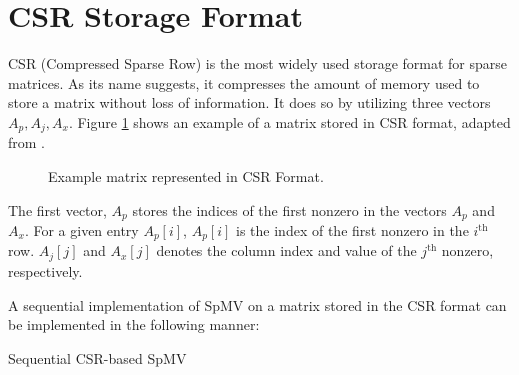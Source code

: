 

\section{CSR Storage Format}
CSR (Compressed Sparse Row) is the most widely used storage format for sparse matrices. As its name suggests, it compresses the amount of memory used to store a matrix without loss of information. It does so by utilizing three vectors \(A_{p}, A_{j}, A_{x}\). Figure \ref{fig:csrformat} shows an example of a matrix stored in CSR format, adapted from \cite{gupta2024gamgi}.



\begin{figure}[ht]
    \centering
    \caption{Example matrix represented in CSR Format.}
    \label{fig:csrformat}
\end{figure}


The first vector, \(A_{p}\) stores the indices of the first nonzero in the vectors \(A_{p}\) and \(A_{x}\). For a given entry \(A_{p}[i]\), \(A_{p}[i]\) is the index of the first nonzero in the \(i^{\text{th}}\) row. \(A_{j}[j]\) and \(A_{x}[j]\) denotes the column index and value of the \(j^{\text{th}}\) nonzero, respectively.
\medskip

A sequential implementation of SpMV on a matrix stored in the CSR format can be implemented in the following manner:
\medskip

\begin{algorithm}[H]
    \caption{Sequential CSR-based SpMV}
    \SetAlgoVlined

\end{algorithm}
\medskip



